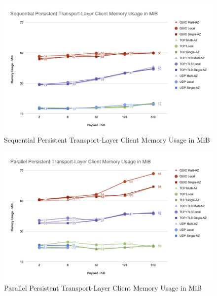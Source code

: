 \begin{figure}[h!]
    \centering
    \includegraphics[width=\linewidth]{figures/charts/Sequential Persistent Transport-Layer Client Memory Usage in MiB.png}
    \caption{Sequential Persistent Transport-Layer Client Memory Usage in MiB}
    \label{fig:sequential_client_transport_memory}
\end{figure}
\begin{figure}[h!]
    \centering
    \includegraphics[width=\linewidth]{figures/charts/Parallel Persistent Transport-Layer Client Memory Usage in MiB.png}
    \caption{Parallel Persistent Transport-Layer Client Memory Usage in MiB}
    \label{fig:parallel_client_transport_memory}
\end{figure}

